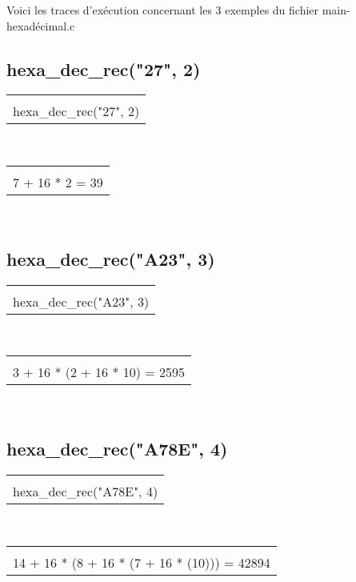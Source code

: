 \documentclass[a4paper, 11pt, oneside]{article}
\begin{document}
Voici les traces d'exécution concernant les 3 exemples du fichier main-hexadécimal.c

\subsection{hexa\_dec\_rec("27", 2)}

 \begin{tabular}{|c|}
 \\
 \\
 hexa\_dec\_rec("27", 2)\\
 \hline
 \end{tabular}~~
 \begin{tabular}{|c|}
 \\
 \\
 7 + 16 * 2 = 39\\
 \hline
 \end{tabular}~~
 
\subsection{hexa\_dec\_rec("A23", 3)}

 \begin{tabular}{|c|}
 \\
 \\
 hexa\_dec\_rec("A23", 3)\\
 \hline
 \end{tabular}~~
 \begin{tabular}{|c|}
 \\
 \\
 3 + 16 * (2 + 16 * 10) = 2595\\
 \hline
 \end{tabular}~~
 
\subsection{hexa\_dec\_rec("A78E", 4)}

 \begin{tabular}{|c|}
 \\
 \\
 hexa\_dec\_rec("A78E", 4)\\
 \hline
 \end{tabular}~~
 \begin{tabular}{|c|}
 \\
 \\
 14 + 16 * (8 + 16 * (7 + 16 * (10))) = 42894\\
 \hline
 \end{tabular}~~
 
\end{document}
